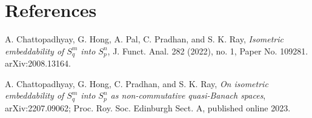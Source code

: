 \documentclass[11pt]{article}
\begin{document}
\section{References}

\begin{enumerate}[label={[\arabic*]}]
\item A. Chattopadhyay, G. Hong, A. Pal, C. Pradhan, and S. K. Ray, \emph{Isometric embeddability of \(S_q^m\) into \(S_p^n\)}, J. Funct. Anal. 282 (2022), no. 1, Paper No. 109281. arXiv:2008.13164.
\item A. Chattopadhyay, G. Hong, C. Pradhan, and S. K. Ray, \emph{On isometric embeddability of \(S_q^m\) into \(S_p^n\) as non-commutative quasi-Banach spaces}, arXiv:2207.09062; Proc. Roy. Soc. Edinburgh Sect. A, published online 2023.
\end{enumerate}
\end{document}
